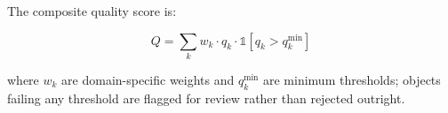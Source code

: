The composite quality score is:

\begin{equation}
    Q = \sum_{k} w_k \cdot q_k \cdot \mathbb{1}[q_k > q_k^{\min}]
\end{equation}

\noindent where $w_k$ are domain-specific weights and $q_k^{\min}$ are minimum thresholds; objects failing any threshold are flagged for review rather than rejected outright.


